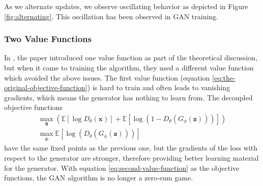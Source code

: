 As we alternate updates, we observe oscillating behavior as depicted
in Figure \ref{fig:alternating}.  This oscillation has been observed
in GAN training.

%
%
%

\subsubsection{Two Value Functions}
\label{sec:two-value}

In \cite{ref:goodfellow-original}, the paper introduced one value
function as part of the theoretical discussion, but when it came to
training the algorithm, they used a different value function which
avoided the above issues. The first value function (equation
\ref{eq:the-original-objective-function}) is hard to train and often
leads to vanishing gradients, which means the generator has nothing to
learn from. The decoupled objective functions
\begin{align}
  \label{eq:second-value-function} \max_{\mathbf{\theta}} \left(
  \mathbb{E}\left[\log{D_\theta(\mathbf{x})}\right] +
  \mathbb{E}\left[\log(1 - D_\theta(G_\phi(\mathbf{z})))\right]
  \right) \\
  \max_{\mathbf{\phi}}\mathbb{E}\left[\log(D_\theta(G_\phi(\mathbf{z})))\right]
\end{align} have the same fixed points as the previous one, but the
gradients of the loss with respect to the generator are stronger,
therefore providing better learning material for the generator. With
equation \ref{eq:second-value-function} as the objective functions,
the GAN algorithm is no longer a zero-sum game.

